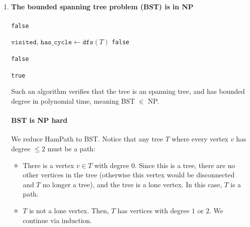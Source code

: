 \documentclass[12pt]{article}
\begin{document}
\begin{enumerate}
  \item \paragraph{The bounded spanning tree problem (BST) is in NP}
    \begin{algorithm}
      \caption{Verify spanning-tree}
      \begin{algorithmic}
         
        \State \Return \texttt{false}
        \EndIf
        \EndFor

        \vspace{3mm}

        \State $\texttt{visited},\, \texttt{has\_cycle} \gets
        \texttt{dfs}(T)$ 
        \State \Return \texttt{false}
        \EndIf

        \vspace{3mm}

         
        \State \Return \texttt{false}
        \EndIf
        \EndFor

        \State \Return \texttt{true}
        \EndProcedure
      \end{algorithmic}
    \end{algorithm}
    Such an algorithm verifies that the tree is an spanning tree, and
    has bounded degree in polynomial time, meaning BST $\in$ NP.

    \paragraph{BST is NP hard} We reduce HamPath to BST. Notice that
    any tree $T$ where every vertex $v$ has degree $\leq 2$ must be a path:
    \begin{itemize}
      \item There is a vertex $v \in T$ with degree $0.$ Since this
        is a tree, there are no other vertices in the tree (otherwise
        this vertex would be disconnected and $T$ no longer a tree),
        and the tree is a lone vertex. In this case, $T$ is a path.

      \item $T$ is not a lone vertex. Then, $T$ has vertices with
        degree $1$ or $2.$ We continue via induction.


\end{itemize}
\end{enumerate}
\end{document}
